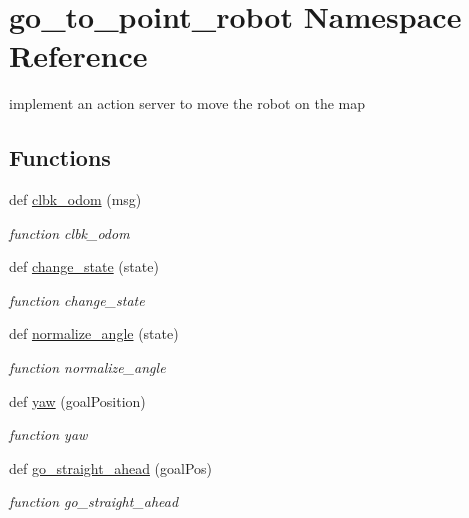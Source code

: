 \hypertarget{namespacego__to__point__robot}{}\section{go\+\_\+to\+\_\+point\+\_\+robot Namespace Reference}
\label{namespacego__to__point__robot}


implement an action server to move the robot on the map  


\subsection*{Functions}
\begin{DoxyCompactItemize}
\item 
def \hyperlink{namespacego__to__point__robot_a03165218d1637827cb202d3df2d5c782}{clbk\+\_\+odom} (msg)
\begin{DoxyCompactList}\small\item\em function clbk\+\_\+odom \end{DoxyCompactList}\item 
def \hyperlink{namespacego__to__point__robot_a7dc82840479105130238b2bad7f4e927}{change\+\_\+state} (state)
\begin{DoxyCompactList}\small\item\em function change\+\_\+state \end{DoxyCompactList}\item 
def \hyperlink{namespacego__to__point__robot_a74e6d464a6a13d4042475098b913c127}{normalize\+\_\+angle} (state)
\begin{DoxyCompactList}\small\item\em function normalize\+\_\+angle \end{DoxyCompactList}\item 
def \hyperlink{namespacego__to__point__robot_a7600c9d4397c4c8100d46e0b8f21d2a0}{yaw} (goal\+Position)
\begin{DoxyCompactList}\small\item\em function yaw \end{DoxyCompactList}\item 
def \hyperlink{namespacego__to__point__robot_a12132668e9be07f4bbaf7211864da3c7}{go\+\_\+straight\+\_\+ahead} (goal\+Pos)
\begin{DoxyCompactList}\small\item\em function go\+\_\+straight\+\_\+ahead \end{DoxyCompactList}\item 

\end{DoxyCompactItemize}
